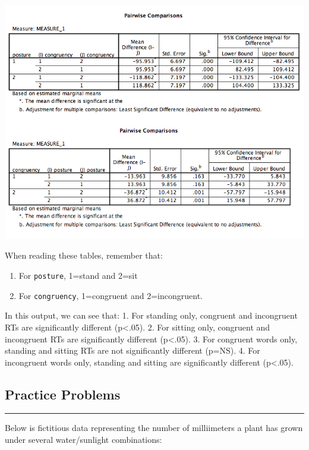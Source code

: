 \documentclass[
]{book}
\providecommand{\tightlist}{%
  \setlength{\itemsep}{0pt}\setlength{\parskip}{0pt}}
\begin{document}
\includegraphics{img/10.4.35.png}

When reading these tables, remember that:

\begin{enumerate}
\def\labelenumi{\arabic{enumi}.}
\tightlist
\item
  For \texttt{posture}, 1=stand and 2=sit
\item
  For \texttt{congruency}, 1=congruent and 2=incongruent.
\end{enumerate}

In this output, we can see that:
1. For standing only, congruent and incongruent RTs are significantly different (p\textless.05).
2. For sitting only, congruent and incongruent RTs are significantly different (p\textless.05).
3. For congruent words only, standing and sitting RTs are not significantly different (p=NS).
4. For incongruent words only, standing and sitting are significantly different (p\textless.05).

\hypertarget{practice-problems-9}{%
\subsection{Practice Problems}\label{practice-problems-9}}

\begin{center}\rule{0.5\linewidth}{0.5pt}\end{center}

Below is fictitious data representing the number of milliimeters a plant has grown under several water/sunlight combinations:
\end{document}
